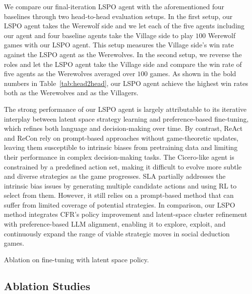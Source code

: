 We compare our final-iteration LSPO agent with the aforementioned four baselines through two head-to-head evaluation setups. In the first setup, our LSPO agent takes the Werewolf side and we let each of the five agents including our agent and four baseline agents take the Village side to play $100$ Werewolf games with our LSPO agent. This setup measures the Village side's win rate against the LSPO agent as the Werewolves. In the second setup, we reverse the roles and let the LSPO agent take the Village side and compare the win rate of five agents as the Werewolves averaged over $100$ games. As shown in the bold numbers in Table~\ref{tab:head2head}, our LSPO agent achieve the highest win rates both as the Werewolves and as the Villagers. 

The strong performance of our LSPO agent is largely attributable to its iterative interplay between latent space strategy learning and preference-based fine-tuning, which refines both language and decision-making over time. By contrast, ReAct and ReCon rely on prompt-based approaches without game-theoretic updates, leaving them susceptible to intrinsic biases from pretraining data and limiting their performance in complex decision-making tasks. The Cicero-like agent is constrained by a predefined action set, making it difficult to evolve more subtle and diverse strategies as the game progresses. SLA partially addresses the intrinsic bias issues by generating multiple candidate actions and using RL to select from them. However, it still relies on a prompt-based method that can suffer from limited coverage of potential strategies. In comparison, our LSPO method integrates CFR’s policy improvement and latent-space cluster refinement with preference-based LLM alignment, enabling it to explore, exploit, and continuously expand the range of viable strategic moves in social deduction games.

\begin{table}[t]
    \centering
    
    \caption{Ablation on fine-tuning with latent space policy.}
    \label{tab:ablation}
\end{table}

\subsection{Ablation Studies}


